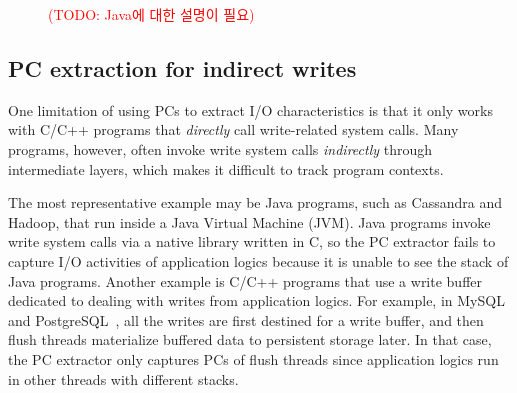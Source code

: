 

\begin{figure}[t]
\centering
\begin{pgfpicture}
\end{pgfpicture}
\caption{\textcolor{red}{(TODO: Java에 대한 설명이 필요)}}
\label{fig:java}
\end{figure}

\subsection{PC extraction for indirect writes}
One limitation of using PCs to extract I/O characteristics is that it only
works with C/C++ programs that \textit{directly} call write-related system
calls.  Many programs, however, often invoke write system calls
\textit{indirectly} through intermediate layers, which makes it difficult to
track program contexts.

The most representative example may be Java programs, such as Cassandra and
Hadoop, that run inside a Java Virtual Machine (JVM). Java programs invoke
write system calls via a native library written in C, so the PC extractor fails
to capture I/O activities of application logics because it is unable to see the
stack of Java programs.  Another example is C/C++ programs that use a write
buffer dedicated to dealing with writes from application logics. For example,
in MySQL~\cite{MySQL} and PostgreSQL~\cite{PostgreSQL}, all the writes are first
destined for a write buffer, and then flush threads materialize buffered data
to persistent storage later.  In that case, the PC extractor only captures PCs
of flush threads since application logics run in other threads with different
stacks.

